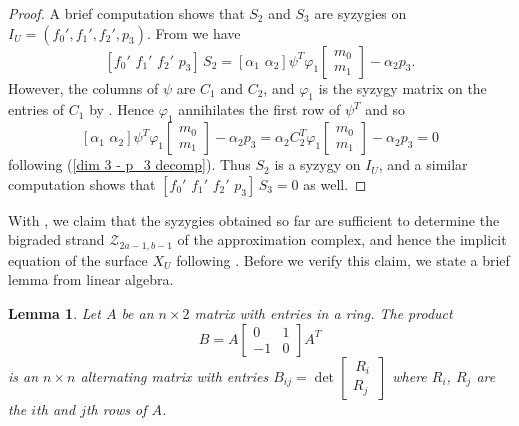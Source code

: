 \documentclass[reqno]{amsart}
\newtheorem{lemma}[thm]{Lemma}
\numberwithin{equation}{section}
\theoremstyle{definition}
\def\m{\mathfrak{m}}
\def\Z{\mathcal{Z}}
\begin{document}
\begin{proof}
A brief computation shows that $S_2$ and $S_3$ are syzygies on $I_U = (f_0',f_1',f_2',p_3)$. From  we have
$$[f_0'\,\,f_1'\,\,f_2'\,\,p_3] \, S_2 = [\alpha_1\,\,\alpha_2]\psi^T \varphi_1\begin{bmatrix}
       m_0\\m_1
    \end{bmatrix} - \alpha_2 p_3.$$
However, the columns of $\psi$ are $C_1$ and $C_2$, and $\varphi_1$ is the syzygy matrix on the entries of $C_1$ by . Hence $\varphi_1$ annihilates the first row of $\psi^T$ and so
$$[\alpha_1\,\,\alpha_2]\psi^T \varphi_1\begin{bmatrix}
       m_0\\m_1
    \end{bmatrix} - \alpha_2 p_3 = \alpha_2 C_2^T\varphi_1\begin{bmatrix}
        m_0\\m_1
   \end{bmatrix} - \alpha_2 p_3 =0$$
following (\ref{dim 3 - p_3 decomp}). Thus $S_2$ is a syzygy on $I_U$, and a similar computation shows that $[f_0'\,\,f_1'\,\,f_2'\,\,p_3] \, S_3=0$ as well.
\end{proof}




With , we claim that the syzygies obtained so far are sufficient to determine the bigraded strand $\Z_{2a-1,b-1}$ of the approximation complex, and hence the implicit equation of the surface $X_U$ following . Before we verify this claim, we state a brief lemma from linear algebra.



\begin{lemma}\label{linear algebra lemma - alternating matrix of minors}
Let $A$ be an $n\times 2$ matrix with entries in a ring. The product
$$B=A\begin{bmatrix}
    0&1\\
    -1&0
\end{bmatrix}A^T$$
is an $n\times n$ alternating matrix with entries $B_{ij} = \det \left[\begin{array}{c}
    \,R_i\,\\
    \hline
    R_j
\end{array}\right]$ where $R_i$, $R_j$ are the $i$th and $j$th rows of $A$. 
\end{lemma}
\end{document}
